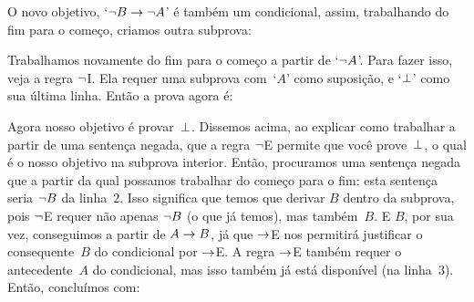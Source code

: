 \begin{fitchproof}
\open
{}
\ellipsesline
{}
\close
{}
\end{fitchproof}
O novo objetivo, `$\neg B \rightarrow \neg A$' \'e  tamb\'em  um  condicional, assim, trabalhando do fim para o come\c co, criamos outra subprova:

\begin{fitchproof}
	\open
	\open
	\ellipsesline
	\close
	\close
\end{fitchproof}
Trabalhamos novamente do fim para o come\c co a partir de `$\neg A$'.  Para fazer isso, veja a regra $\neg$I. Ela requer uma subprova com~`$A$' como suposi\c c\~ao, e `$\bot$' como sua \'ultima linha. Ent\~ao a prova agora \'e:
 
\begin{fitchproof}
	\open
	\open
	\open{}
	\ellipsesline
	\close
	\close
	\close
\end{fitchproof}
Agora nosso objetivo \'e provar~$\bot$. Dissemos acima, ao explicar como trabalhar a partir de uma senten\c ca negada, que a regra $\neg$E permite que voc\^e prove~$\bot$, o qual \'e o nosso objetivo na subprova interior. Ent\~ao, procuramos uma senten\c ca negada  que a partir da qual possamos trabalhar do come\c co para o fim: esta senten\c ca seria $\neg B$ da linha~$2$. Isso significa que temos que derivar $B$ dentro da subprova, pois $\neg$E requer n\~ao apenas $\neg B$ (o que j\'a temos), mas tamb\'em~$B$. E $B$, por sua vez, conseguimos a partir de $A \rightarrow B$, j\'a que $\rightarrow$E nos permitir\'a justificar o consequente~$B$ do condicional por $\rightarrow$E. A regra $\rightarrow$E tamb\'em requer o antecedente~$A$ do condicional, mas isso tamb\'em j\'a est\'a dispon\'ivel (na linha~$3$). Ent\~ao, conclu\'imos  com:


\begin{fitchproof}
	\open
	\open
	\open{}
	\close
	\close
	\close
\end{fitchproof}


